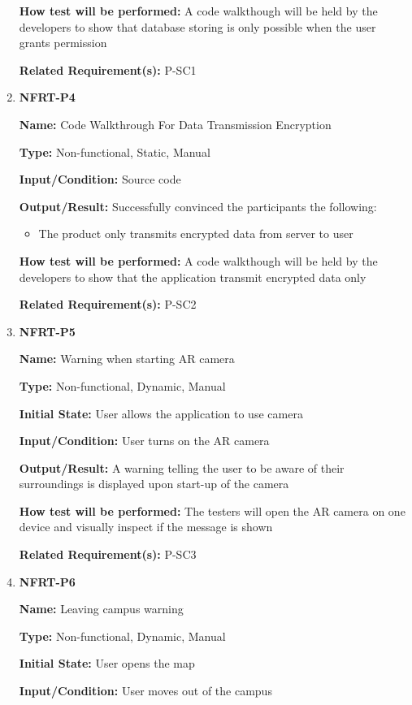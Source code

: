 \documentclass[12pt, titlepage]{article}
\begin{document}
\begin{enumerate}
\textbf{How test will be performed:} A code walkthough will be held by the developers to show that database storing is only possible when the user grants permission

\textbf{Related Requirement(s):} P-SC1

\item{\textbf{NFRT-P4}}

\textbf{Name:} Code Walkthrough For Data Transmission Encryption

\textbf{Type:} Non-functional, Static, Manual

\textbf{Input/Condition:} Source code

\textbf{Output/Result:} Successfully convinced the participants the following:
\begin{itemize}
  \item The product only transmits encrypted data from server to user
\end{itemize}

\textbf{How test will be performed:}  A code walkthough will be held by the developers to show that the application transmit encrypted data only

\textbf{Related Requirement(s):} P-SC2

\item{\textbf{NFRT-P5}}

\textbf{Name:} Warning when starting AR camera

\textbf{Type:} Non-functional, Dynamic, Manual
					
\textbf{Initial State:} User allows the application to use camera
					
\textbf{Input/Condition:} User turns on the AR camera
					
\textbf{Output/Result:} A warning telling the user to be aware of their surroundings is displayed upon start-up of the camera

\textbf{How test will be performed:} The testers will open the AR camera on one device and visually inspect if the message is shown

\textbf{Related Requirement(s):} P-SC3

\item{\textbf{NFRT-P6}}

\textbf{Name:} Leaving campus warning

\textbf{Type:} Non-functional, Dynamic, Manual
					
\textbf{Initial State:} User opens the map
					
\textbf{Input/Condition:} User moves out of the campus
					

\end{enumerate}
\end{document}
